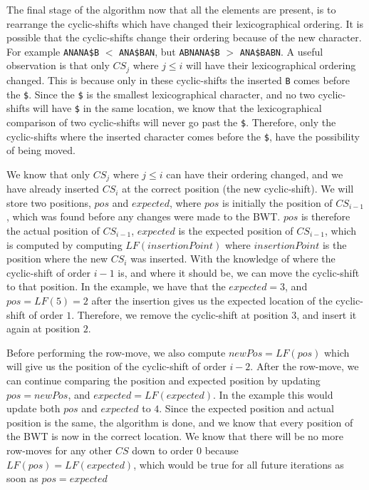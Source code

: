 The final stage of the algorithm now that all the elements are present, is to rearrange
the cyclic-shifts which have changed their lexicographical ordering. It is possible that
the cyclic-shifts change their ordering because of the new character. For example
\verb|ANANA$B| $<$ \verb|ANA$BAN|, but \verb|ABNANA$B| $>$ \verb|ANA$BABN|. A useful
observation is that only $CS_j$ where $j \leq i$ will have their lexicographical ordering
changed. This is because only in these cyclic-shifts the inserted \verb|B| comes before
the \verb|$|. Since the \verb|$| is the smallest lexicographical character, and no two
cyclic-shifts will have \verb|$| in the same location, we know that the lexicographical
comparison of two cyclic-shifts will never go past the \verb|$|. Therefore, only the
cyclic-shifts where the inserted character comes before the \verb|$|, have the possibility
of being moved.

We know that only $CS_j$ where $j \leq i$ can have their ordering changed, and we have
already inserted $CS_i$ at the correct position (the new cyclic-shift). We will store two
positions, $pos$ and $expected$, where $pos$ is initially the position of $CS_{i - 1}$,
which was found before any changes were made to the BWT. $pos$ is therefore the actual
position of $CS_{i - 1}$, $expected$ is the expected position of $CS_{i - 1}$, which is
computed by computing $LF(insertionPoint)$ where $insertionPoint$ is the position where
the new $CS_i$ was inserted. With the knowledge of where the cyclic-shift of order $i - 1$
is, and where it should be, we can move the cyclic-shift to that position. In the example,
we have that the $expected = 3$, and $pos = LF(5) = 2$ after the insertion gives us the
expected location of the cyclic-shift of order $1$. Therefore, we remove the cyclic-shift
at position $3$, and insert it again at position $2$.

Before performing the row-move, we also compute $newPos = LF(pos)$ which will give us the
position of the cyclic-shift of order $i - 2$. After the row-move, we can continue
comparing the position and expected position by updating $pos = newPos$, and $expected =
LF(expected)$. In the example this would update both $pos$ and $expected$ to $4$. Since
the expected position and actual position is the same, the algorithm is done, and we know
that every position of the BWT is now in the correct location. We know that there will be
no more row-moves for any other $CS$ down to order $0$ because $LF(pos) = LF(expected)$,
which would be true for all future iterations as soon as $pos = expected$

